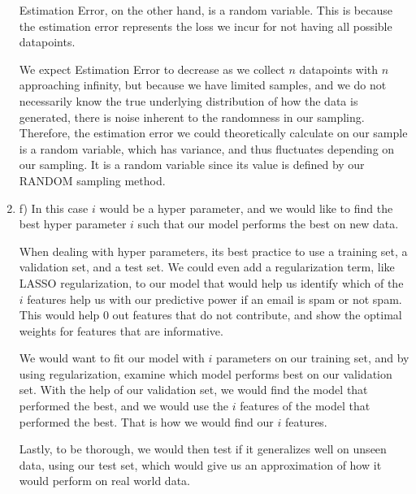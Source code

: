 \documentclass{article}
\theoremstyle{plain}
\theoremstyle{definition}
\begin{document}
\begin{enumerate}
    Estimation Error, on the other hand, is a random variable. This is because the estimation error represents the loss we incur for not having all possible datapoints. 
    
    We expect Estimation Error to decrease as we collect $n$ datapoints with $n$ approaching infinity, but because we have limited samples, and we do not necessarily know the true underlying distribution of how the data is generated, there is noise inherent to the randomness in our sampling. Therefore, the estimation error we could theoretically calculate on our sample is a random variable, which has variance, and thus fluctuates depending on our sampling. It is a random variable since its value is defined by our RANDOM sampling method. 
    
    \item f) In this case $i$ would be a hyper parameter, and we would like to find the best hyper parameter $i$ such that our model performs the best on new data. 
    
    When dealing with hyper parameters, its best practice to use a training set, a validation set, and a test set. We could even add a regularization term, like LASSO regularization, to our model that would help us identify which of the $i$ features help us with our predictive power if an email is spam or not spam. This would help 0 out features that do not contribute, and show the optimal weights for features that are informative.
    
    We would want to fit our model with $i$ parameters on our training set, and by using regularization, examine which model performs best on our validation set. With the help of our validation set, we would find the model that performed the best, and we would use the $i$ features of the model that performed the best. That is how we would find our $i$ features.
    
    Lastly, to be thorough, we would then test if it generalizes well on unseen data, using our test set, which would give us an approximation of how it would perform on real world data.
\end{enumerate}
\end{document}
